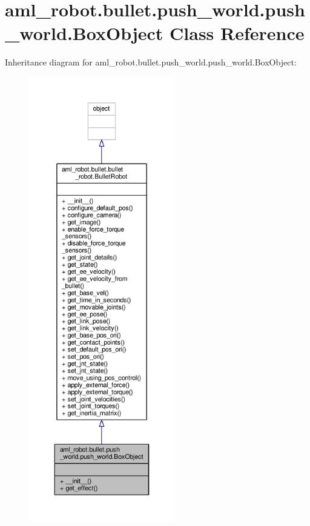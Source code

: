 \hypertarget{classaml__robot_1_1bullet_1_1push__world_1_1push__world_1_1_box_object}{\section{aml\-\_\-robot.\-bullet.\-push\-\_\-world.\-push\-\_\-world.\-Box\-Object Class Reference}
\label{classaml__robot_1_1bullet_1_1push__world_1_1push__world_1_1_box_object}
}


Inheritance diagram for aml\-\_\-robot.\-bullet.\-push\-\_\-world.\-push\-\_\-world.\-Box\-Object\-:\nopagebreak
\begin{figure}[H]
\begin{center}
\leavevmode
\includegraphics[height=550pt]{classaml__robot_1_1bullet_1_1push__world_1_1push__world_1_1_box_object__inherit__graph}
\end{center}
\end{figure}


